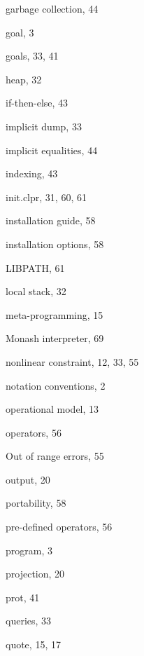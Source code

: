 \begin{theindex}
  \indexspace

  \item garbage collection, 44
  \item goal, 3
  \item goals, 33, 41

  \indexspace

  \item heap, 32

  \indexspace

  \item if-then-else, 43
  \item implicit dump, 33
  \item implicit equalities, 44
  \item indexing, 43
  \item init.clpr, 31, 60, 61
  \item installation guide, 58
  \item installation options, 58

  \indexspace

  \item LIBPATH, 61
  \item local stack, 32

  \indexspace

  \item meta-programming, 15
  \item Monash interpreter, 69

  \indexspace

  \item nonlinear constraint, 12, 33, 55
  \item notation conventions, 2

  \indexspace

  \item operational model, 13
  \item operators, 56
  \item Out of range errors, 55
  \item output, 20

  \indexspace

  \item portability, 58
  \item pre-defined operators, 56
  \item program, 3
  \item projection, 20
  \item prot, 41

  \indexspace

  \item queries, 33
  \item quote, 15, 17


\end{theindex}
